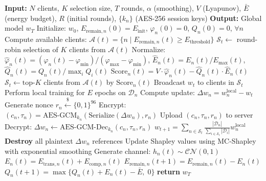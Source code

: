 \begin{algorithm}
\caption{Dual Scheduling with AES-256-GCM Secure Transmission}
\begin{algorithmic}[1]
\STATE \textbf{Input:} $N$ clients, $K$ selection size, $T$ rounds, $\alpha$ (smoothing), $V$ (Lyapunov), $\bar{E}$ (energy budget), $R$ (initial rounds), $\{k_n\}$ (AES-256 session keys)
\STATE \textbf{Output:} Global model $w_T$
\STATE Initialize: $w_0$, $E_{\text{remain},n}(0) = E_{\text{init}}$, $\varphi_n(0) = 0$, $Q_n(0) = 0$, $\forall n$
    \STATE Compute available clients: $\mathcal{A}(t) = \{n \mid E_{\text{remain},n}(t) \geq E_{\text{threshold}}\}$
        \STATE $\mathcal{S}_t \leftarrow$ round-robin selection of $K$ clients from $\mathcal{A}(t)$
    \ELSE
        \STATE Normalize: $\hat{\varphi}_n(t) = (\varphi_n(t) - \varphi_{\min}) / (\varphi_{\max} - \varphi_{\min})$, $\hat{E}_n(t) = E_n(t) / E_{\max}(t)$, $\hat{Q}_n(t) = Q_n(t) / \max_i Q_i(t)$
            \STATE $\text{Score}_n(t) = V \cdot \hat{\varphi}_n(t) - \hat{Q}_n(t) \cdot \hat{E}_n(t)$
        \ENDFOR
        \STATE $\mathcal{S}_t \leftarrow \text{top-}K$ clients from $\mathcal{A}(t)$ by $\text{Score}_n(t)$
    \ENDIF
    \STATE Broadcast $w_t$ to clients in $\mathcal{S}_t$
        \STATE Perform local training for $E$ epochs on $\mathcal{D}_n$
        \STATE Compute update: $\Delta w_n = w_n^{\text{local}} - w_t$
        \STATE Generate nonce $r_n \xleftarrow{\$} \{0,1\}^{96}$
        \STATE Encrypt: $(c_n, \tau_n) = \text{AES-GCM}_{k_n}(\text{Serialize}(\Delta w_n), r_n)$
        \STATE Upload $(c_n, \tau_n, r_n)$ to server
    \ENDFOR
        \STATE Decrypt: $\Delta w_n \leftarrow \text{AES-GCM-Dec}_{k_n}(c_n, \tau_n, r_n)$
    \ENDFOR
    \STATE $w_{t+1} = \sum_{n\in\mathcal{S}_t} \frac{|\mathcal{D}_n|}{\sum_{i\in\mathcal{S}_t}|\mathcal{D}_i|} w_n^{\text{local}}$
    \STATE \textbf{Destroy} all plaintext $\Delta w_n$ references
    \STATE Update Shapley values using MC-Shapley with exponential smoothing
        \STATE Generate channel: $h_n(t) \sim \mathcal{CN}(0,1)$
        \STATE $E_n(t) = E_{\text{trans},n}(t) + E_{\text{comp},n}(t)$
        \STATE $E_{\text{remain},n}(t+1) = E_{\text{remain},n}(t) - E_n(t)$
        \STATE $Q_n(t+1) = \max\{Q_n(t) + E_n(t) - \bar{E}, \; 0\}$
    \ENDFOR
\ENDFOR
\STATE \textbf{return} $w_T$
\end{algorithmic}
\end{algorithm}
